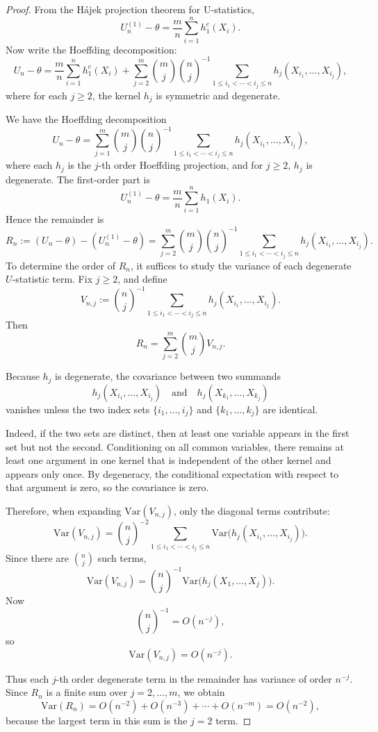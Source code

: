 \documentclass[11pt]{article}
\theoremstyle{definition}
\begin{document}
\begin{proof}

From the Hájek projection theorem for U-statistics,
\[
U_n^{(1)}-\theta
=
\frac{m}{n}\sum_{i=1}^n h_1^c(X_i).
\]
Now write the Hoeffding decomposition:
\[
U_n-\theta
=
\frac{m}{n}\sum_{i=1}^n h_1^c(X_i)
+
\sum_{j=2}^m \binom{m}{j}
\binom{n}{j}^{-1}
\sum_{1\le i_1<\cdots<i_j\le n}
h_j(X_{i_1},\dots,X_{i_j}),
\]
where for each $j\ge2$, the kernel $h_j$ is symmetric and degenerate.

We have the Hoeffding decomposition
\[
U_n-\theta
=
\sum_{j=1}^m \binom{m}{j}
\binom{n}{j}^{-1}
\sum_{1\le i_1<\cdots<i_j\le n}
h_j(X_{i_1},\dots,X_{i_j}),
\]
where each \(h_j\) is the \(j\)-th order Hoeffding projection, and for \(j\ge 2\), \(h_j\) is
degenerate. The first-order part is
\[
U_n^{(1)}-\theta
=
\frac{m}{n}\sum_{i=1}^n h_1(X_i).
\]
Hence the remainder is
\[
R_n
:=
(U_n-\theta)-(U_n^{(1)}-\theta)
=
\sum_{j=2}^m \binom{m}{j}
\binom{n}{j}^{-1}
\sum_{1\le i_1<\cdots<i_j\le n}
h_j(X_{i_1},\dots,X_{i_j}).
\]
To determine the order of \(R_n\), it suffices to study the variance of each degenerate
\(U\)-statistic term. Fix \(j\ge 2\), and define
\[
V_{n,j}
:=
\binom{n}{j}^{-1}
\sum_{1\le i_1<\cdots<i_j\le n}
h_j(X_{i_1},\dots,X_{i_j}).
\]
Then
\[
R_n=\sum_{j=2}^m \binom{m}{j} V_{n,j}.
\]

Because \(h_j\) is degenerate, the covariance between two summands
\[
h_j(X_{i_1},\dots,X_{i_j})
\quad\text{and}\quad
h_j(X_{k_1},\dots,X_{k_j})
\]
vanishes unless the two index sets \(\{i_1,\dots,i_j\}\) and \(\{k_1,\dots,k_j\}\) are identical.

Indeed, if the two sets are distinct, then at least one variable appears in the first set but not
the second. Conditioning on all common variables, there remains at least one argument in one kernel
that is independent of the other kernel and appears only once. By degeneracy,
the conditional expectation with respect to that argument is zero, so the covariance is zero.

Therefore, when expanding \(\mathrm{Var}(V_{n,j})\), only the diagonal terms contribute:
\[
\mathrm{Var}(V_{n,j})
=
\binom{n}{j}^{-2}
\sum_{1\le i_1<\cdots<i_j\le n}
\mathrm{Var}\!\bigl(h_j(X_{i_1},\dots,X_{i_j})\bigr).
\]
Since there are \(\binom{n}{j}\) such terms,
\[
\mathrm{Var}(V_{n,j})
=
\binom{n}{j}^{-1}\mathrm{Var}\!\bigl(h_j(X_1,\dots,X_j)\bigr).
\]
Now
\[
\binom{n}{j}^{-1}=O(n^{-j}),
\]
so
\[
\mathrm{Var}(V_{n,j})=O(n^{-j}).
\]

Thus each \(j\)-th order degenerate term in the remainder has variance of order \(n^{-j}\). Since
\(R_n\) is a finite sum over \(j=2,\dots,m\), we obtain
\[
\mathrm{Var}(R_n)
=
O(n^{-2})+O(n^{-3})+\cdots+O(n^{-m})
=
O(n^{-2}),
\]
because the largest term in this sum is the \(j=2\) term.


\end{proof}
\end{document}
